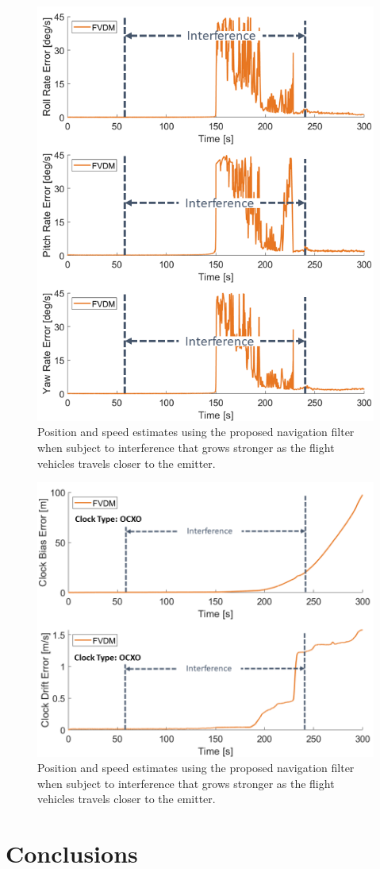 \begin{figure}[!ht]
    \centering
    \includegraphics[width=0.75\linewidth]{Figures/Results/trajectoryfigure/Slide13.PNG}
    \caption{Position and speed estimates using the proposed navigation filter when subject to interference that grows stronger as the flight vehicles travels closer to the emitter.}\label{fig:AngScene2}
\end{figure}


\begin{figure}[!ht]
    \centering
    \includegraphics[width=0.75\linewidth]{Figures/Results/trajectoryfigure/Slide25.PNG}
    \caption{Position and speed estimates using the proposed navigation filter when subject to interference that grows stronger as the flight vehicles travels closer to the emitter.}\label{fig:ClkScene2}
\end{figure}


\section{\textbf{Conclusions}}